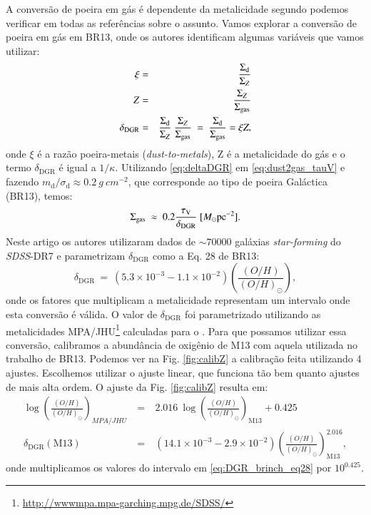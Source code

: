 A conversão de poeira em gás é dependente da metalicidade segundo podemos verificar em todas as
referências sobre o assunto. Vamos explorar a conversão de poeira em gás em BR13, onde os autores
identificam algumas variáveis que vamos utilizar:
\begin{eqnarray}
	\xi &=& \frac{\Sigma_{\mathrm{d}}}{\Sigma_Z} \\
	Z &=& \frac{\Sigma_Z}{\Sigma_{\mathrm{gas}}}  \\
	\delta_{\mathrm{DGR}} &=& \frac{\Sigma_{\mathrm{d}}}{\Sigma_Z}\ \frac{\Sigma_Z}{\Sigma_{\mathrm{gas}}}\ =\
\frac{\Sigma_{\mathrm{d}}}{\Sigma_{\mathrm{gas}}} = \xi Z,
	\label{eq:deltaDGR}
\end{eqnarray}
\noindent onde $\xi$ é a razão poeira-metais ({\em dust-to-metals}), Z é a metalicidade do gás e o
termo $\delta_{\mathrm{DGR}}$ é igual a $1/\kappa$. Utilizando \eqref{eq:deltaDGR} em
\eqref{eq:dust2gas_tauV} e fazendo $m_{\mathrm{d}}/\sigma_{\mathrm{d}} \approx 0.2\ g\ cm^{-2}$, que
corresponde ao tipo de poeira Galáctica (BR13), temos:
\begin{equation}
	\Sigma_{\mathrm{gas}}\ \approx\ 0.2 \frac{\tau_{\mathrm{V}}}{\delta_{\mathrm{DGR}}}\ [M_\odot \mathrm{pc}^{-2}].
	\label{eq:SigmaGasBR}
\end{equation}
Neste artigo os autores utilizaram dados de $\sim 70000$ galáxias {\em star-forming} do
\textit{SDSS}-DR7 e parametrizam $\delta_{\mathrm{DGR}}$ como a Eq. 28 de BR13:
\begin{equation}
	\delta_{\mathrm{DGR}}\ =\ (5.3 \times 10^{-3} - 1.1 \times 10^{-2})
\left(\frac{(O/H)}{(O/H)_\odot}\right),
	\label{eq:DGR_brinch_eq28}
\end{equation}
\noindent onde os fatores que multiplicam a metalicidade representam um intervalo onde esta
conversão é válida. O valor de $\delta_{\mathrm{DGR}}$ foi parametrizado utilizando as metalicidades
MPA/JHU\footnote{\href{http://wwwmpa.mpa-garching.mpg.de/SDSS/}{http://wwwmpa.mpa-garching.mpg.de/SDSS/}}
calculadas para o \SDSS. Para que possamos utilizar essa conversão, calibramos a abundância de
oxigênio de M13 com aquela utilizada no trabalho de BR13. Podemos ver na Fig. \ref{fig:calibZ} a
calibração feita utilizando 4 ajustes. Escolhemos utilizar o ajuste linear, que funciona tão bem
quanto ajustes de mais alta ordem. O ajuste da Fig. \ref{fig:calibZ} resulta em:
\begin{eqnarray}
	\label{eq:myZ}
	\log \left(\frac{(O/H)}{(O/H)_\odot}\right)_{MPA/JHU}\ &=&\ 2.016\ \log
\left(\frac{(O/H)}{(O/H)_\odot}\right)_{\mathrm{M}13} + 0.425 \\
	\label{eq:myDGR}	
	\delta_{\mathrm{DGR}}(\mathrm{M}13)\ &=&\ (14.1 \times 10^{-3} - 2.9 \times 10^{-2})
\left(\frac{(O/H)}{(O/H)_\odot}\right)^{2.016}_{\mathrm{M}13},
\end{eqnarray}
\noindent onde multiplicamos os valores do intervalo em \eqref{eq:DGR_brinch_eq28} por $10^{0.425}$.

